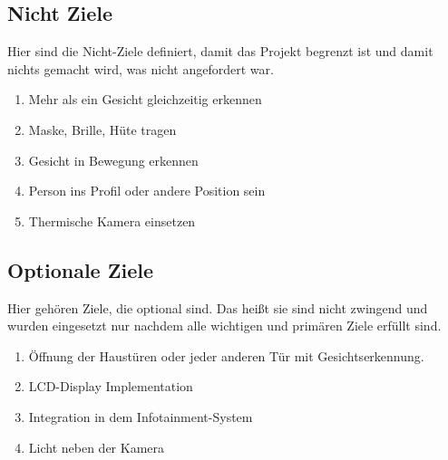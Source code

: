 \subsection{Nicht Ziele}
Hier sind die Nicht-Ziele definiert, damit das Projekt begrenzt ist und damit nichts gemacht wird, was nicht angefordert war.

\begin{enumerate}
	\item Mehr als ein Gesicht gleichzeitig erkennen
	
	\item Maske, Brille, Hüte tragen 
	
	\item Gesicht in Bewegung erkennen 
	
	\item Person ins Profil oder andere Position sein
	
	\item Thermische Kamera einsetzen
	
	
\end{enumerate}
\subsection{Optionale Ziele}
Hier gehören Ziele, die optional sind. Das heißt sie sind nicht zwingend und wurden eingesetzt nur nachdem alle wichtigen und primären Ziele erfüllt sind.

\begin{enumerate}
	
	
	\item Öffnung der Haustüren oder jeder anderen Tür mit Gesichtserkennung.
	
	\item LCD-Display Implementation
	
	\item Integration in dem Infotainment-System
	
	\item Licht neben der Kamera 
\end{enumerate}
